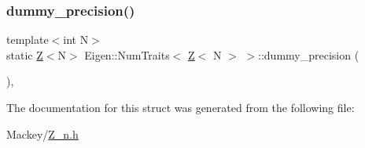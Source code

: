 \mbox{\label{structEigen_1_1NumTraits_3_01Z_3_01N_01_4_01_4_a75bda6fb36d6d253deba3310e9c5ed10}} 
\subsubsection{\texorpdfstring{dummy\+\_\+precision()}{dummy\_precision()}}
{\footnotesize\ttfamily template$<$int N$>$ \\
static \hyperlink{classZ}{Z}$<$N$>$ Eigen\+::\+Num\+Traits$<$ \hyperlink{classZ}{Z}$<$ N $>$ $>$\+::dummy\+\_\+precision (\begin{DoxyParamCaption}{ }\end{DoxyParamCaption})\hspace{0.3cm}{\ttfamily [inline]}, {\ttfamily [static]}}



The documentation for this struct was generated from the following file\+:\begin{DoxyCompactItemize}
\item 
Mackey/\hyperlink{Z__n_8h}{Z\+\_\+n.\+h}\end{DoxyCompactItemize}
